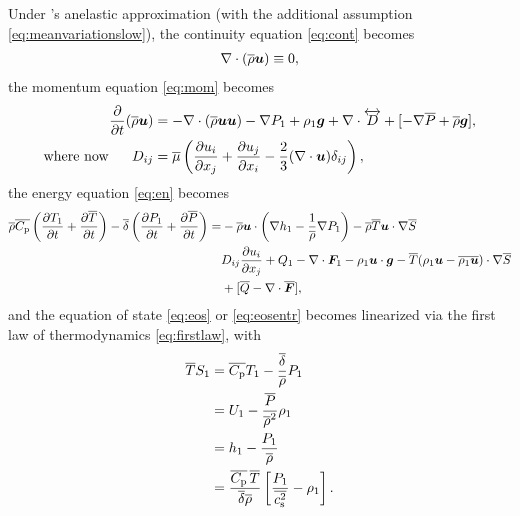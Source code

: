 \documentclass[12pt]{article}
\newcommand{\vecf}{\bm{F}}
\begin{document}
	Under \citet{Gough1969}'s anelastic approximation (with the additional assumption \eqref{eq:meanvariationslow}), the continuity equation \eqref{eq:cont} becomes
	\begin{align}\label{eq:ancont}
		\nabla\cdot(\overline{\rho}\bm{u})\equiv 0,
	\end{align}
	the momentum equation \eqref{eq:mom} becomes 
	\begin{subequations}\label{eq:anmom}
	\begin{align}
		\frac{\partial}{\partial t}(\overline{\rho}\bm{u})&=-\nabla\cdot(\overline{\rho}\bm{u}\bm{u}) - \nabla P_1 +\rho_1\bm{g} +\nabla\cdot \overleftrightarrow{D}+[-\nabla\overline{P} + \overline{\rho}\bm{g}],\label{eq:anmommain}\\
		\text{where now}\ \ \ \ \  D_{ij}& = \overline{\mu}\left(\frac{\partial u_i}{\partial x_j} + \frac{\partial u_j}{\partial x_i} - \frac{2}{3}(\nabla\cdot\bm{u})\delta_{ij}\right)\label{eq:anmomvisc},
	\end{align}
	\end{subequations}
	the energy equation \eqref{eq:en} becomes 
	\begin{align}\label{eq:anen}
		\rhoover\cpover\left(\pderiv{\tmpone}{t}+\pderiv{\tmpover}{t}\right)- \deltaover\left(\pderiv{\prsone}{t} + \pderiv{\prsover}{t}\right) = &-\rhoover\vecu\cdot\left(\nabla \enthone-\frac{1}{\rhoover}\nabla \prsone\right) - \rhoover \tmpover \ugrad \entrover\nonumber\\
		& D_{ij}\pderiv{u_i}{x_j} + Q _1- \Div\vecf_1 -\rhoone\vecu\cdot\vecg - \tmpover(\rhoone\vecu-\overline{\rhoone\vecu})\cdot\nabla\entrover\nonumber\\
		&+ [\heatover - \Div\overline{\vecf}],
	\end{align}
  and the equation of state \eqref{eq:eos} or \eqref{eq:eosentr} becomes linearized via the first law of thermodynamics \eqref{eq:firstlaw}, with
  \begin{subequations}\label{eq:anfirstlawpert}
  \begin{align}
  	\overline{T} S_1 &= \overline{C_{\rm{p}}} T_1 - \frac{\overline{\delta}}{\overline{\rho}} P_1\label{eq:anfirstlawperttp}\\
  	&= U_1 - \frac{\overline{P}}{\overline{\rho}^2}\rho_1 \label{eq:linu}\\
  	&= h_1 - \frac{P_1}{\overline{\rho}}\label{eq:h1}\\
  	&= \frac{\overline{C_{\rm{p}}}\, \overline{T}}{\overline{\delta}\overline{\rho}}\left[\frac{P_1}{\overline{c_{\rm s}^2}}-\rho_1\right].
  \end{align}
  \end{subequations}
\end{document}
